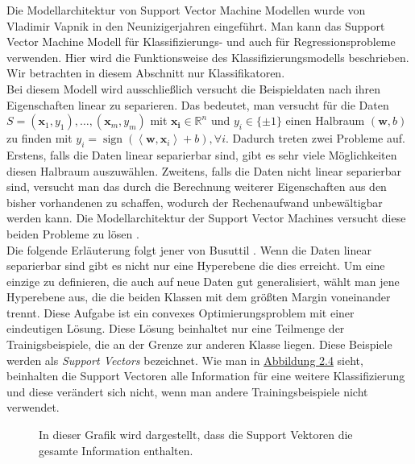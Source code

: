 Die Modellarchitektur von Support Vector Machine Modellen wurde von Vladimir Vapnik \cite{SVMVapnik} in den Neunizigerjahren eingef\"uhrt. Man kann das 
Support Vector Machine Modell f\"ur Klassifizierungs- und auch f\"ur Regressionsprobleme verwenden. Hier wird die Funktionsweise des Klassifizierungsmodells
beschrieben. Wir betrachten in diesem Abschnitt nur Klassifikatoren. \\

Bei diesem Modell wird ausschlie{\ss}lich versucht die Beispieldaten nach ihren Eigenschaften linear zu separieren. Das bedeutet, man versucht f\"ur die 
Daten $S = (\mathbf{x}_1,y_1),\dots, (\mathbf{x}_m, y_m)$ mit $\mathbf{x_i} \in \mathbb{R}^n$ und $y_i \in \{\pm1\}$ einen Halbraum $(\mathbf{w},b)$ zu finden 
mit $y_i = \operatorname{sign}(\left\langle \mathbf{w},\mathbf{x}_i\right\rangle + b), \forall i$. Dadurch treten zwei Probleme auf. Erstens, falls die Daten linear separierbar sind, 
gibt es sehr viele M\"oglichkeiten diesen Halbraum auszuw\"ahlen. Zweitens, falls die Daten nicht linear separierbar sind, versucht man das durch die Berechnung 
weiterer Eigenschaften aus den bisher vorhandenen zu schaffen, wodurch der Rechenaufwand unbew\"altigbar werden kann. Die Modellarchitektur der Support Vector Machines versucht
diese beiden Probleme zu l\"osen \cite[Kapitel 15]{shalev}. \\

Die folgende Erl\"auterung folgt jener von Busuttil \cite{SVM1}. Wenn die Daten linear separierbar sind gibt es nicht nur eine Hyperebene die dies erreicht.
Um eine einzige zu definieren, die auch auf neue Daten gut generalisiert, w\"ahlt man jene Hyperebene aus, die die beiden Klassen mit dem gr\"o{\ss}ten Margin 
voneinander trennt. Diese Aufgabe ist ein convexes Optimierungsproblem mit einer eindeutigen L\"osung. Diese L\"osung beinhaltet nur eine Teilmenge der Trainigsbeispiele, die 
an der Grenze zur anderen Klasse liegen. Diese Beispiele werden als \textit{Support Vectors} bezeichnet. Wie man in \hyperref[fig:svm2]{Abbildung 2.4} sieht, beinhalten die Support Vectoren
alle Information f\"ur eine weitere Klassifizierung und diese ver\"andert sich nicht, wenn man andere Trainingsbeispiele nicht verwendet. \\

\begin{figure}[ht]
  \label{fig:svm1}
  \begin{center}
    \begin{tiny}
    \end{tiny}
  \end{center}
  \caption[Darstellung der Support Vektoren]
    {In dieser Grafik wird dargestellt, dass die Support Vektoren die gesamte Information enthalten.}
\end{figure}



